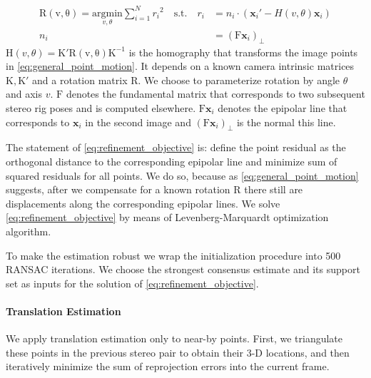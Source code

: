 \documentclass[runningheads]{llncs}
\begin{document}
\begin{equation}\label{eq:refinement_objective}
  \begin{split}
    \mathrm{R(v,\theta)} = \underset{v,\theta}{\mathrm{argmin}}
    \sum_{i=1}^N{r_i}^2\quad \text{s.t.}\quad r_i&=n_i\cdot (\mathbf{x}_i'-H(v,\theta)\mathbf{x}_i) \\ n_i &=
    (\mathrm{F}\mathbf{x}_i)_\perp 
  \end{split}
\end{equation}
$\mathrm{H}(v,\theta) = \mathrm{K'R(v,\theta)K^{-1}}$ is the
homography that transforms the image points in
\ref{eq:general_point_motion}. It depends on a known camera intrinsic
matrices $\mathrm{K,K}'$ and a rotation matrix $\mathrm{R}$.  We
choose to parameterize rotation by angle $\theta$ and axis $v$.
$\mathrm{F}$ denotes the fundamental matrix that corresponds to two
subsequent stereo rig poses and is computed
elsewhere. $\mathrm{F}\mathbf{x}_i$ denotes the epipolar line that
corresponds to $\mathbf{x}_i$ in the second image and
$(\mathrm{F}\mathbf{x}_i)_\perp$ is the normal this line.

The statement of \ref{eq:refinement_objective} is: define the point
residual as the orthogonal distance to the corresponding epipolar line
and minimize sum of squared residuals for all points.  We do so,
because as \ref{eq:general_point_motion} suggests, after we compensate
for a known rotation $\mathrm{R}$ there still are displacements along
the corresponding epipolar lines. We solve
\ref{eq:refinement_objective} by means of Levenberg-Marquardt
optimization algorithm.

To make the estimation robust we wrap the initialization procedure
into 500 RANSAC iterations.  We choose the strongest consensus
estimate and its support set as inputs for the solution of
\ref{eq:refinement_objective}.

\paragraph{Translation Estimation} We apply translation estimation
only to near-by points.  First, we triangulate these points in the
previous stereo pair to obtain their 3-D locations, and then
iteratively minimize the sum of reprojection errors into the current
frame.
\end{document}
